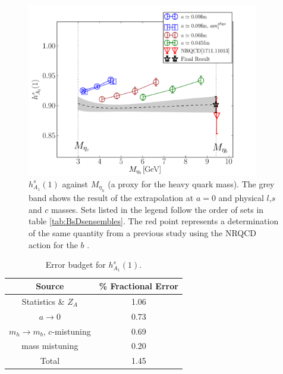 \begin{figure}[htb!]
  \begin{center}
  \includegraphics[width=0.90\textwidth]{images/BsDsstar/hA1_vsmh.pdf}
  \caption{ $h_{A_1}^s(1)$ against $M_{\eta_h}$ (a proxy for the heavy quark mass). The grey band shows the result of the extrapolation at $a=0$ and physical $l$,$s$ and $c$ masses. Sets listed in the legend follow the order of sets in table \ref{tab:BsDsensembles}. The red point represents a determination of the same quantity from a previous study using the NRQCD action for the $b$ \cite{Harrison:2017fmw}. \label{fig:hA1_vsmetah}}
  \end{center}
\end{figure}

\begin{table}
  \begin{center}
    \begin{tabular}{c c}
      \hline
      Source & \% Fractional Error \\ [0.5ex]
      \hline
      Statistics \& $Z_A$ & 1.06  \\ [1ex]
      $a\to 0$ & 0.73  \\ [1ex]
      $m_h \to m_b$, $c$-mistuning & 0.69 \\ [1ex]
      mass mistuning & 0.20  \\ [1ex]
      \hline
      Total & 1.45 \\ [1ex]
      \hline
    \end{tabular}
  \end{center}
  \caption{Error budget for $h^s_{A_1}(1)$. \label{tab:errorbudget_BsDsstar}}
\end{table}

